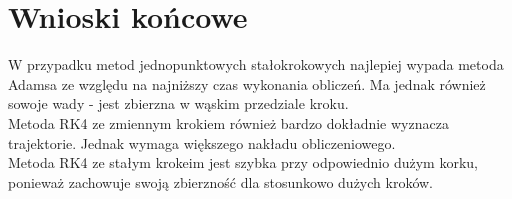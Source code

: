 \documentclass[a4paper, 12pt]{article}
\begin{document}
\section{Wnioski końcowe}
W przypadku metod jednopunktowych stałokrokowych najlepiej wypada metoda Adamsa ze względu na najniższy czas wykonania obliczeń. Ma jednak również sowoje wady - jest  zbierzna w wąskim przedziale kroku. \\
Metoda RK4 ze zmiennym krokiem również bardzo dokładnie wyznacza trajektorie. Jednak wymaga większego nakładu obliczeniowego.\\
Metoda RK4 ze stałym krokeim jest szybka przy odpowiednio dużym korku, ponieważ zachowuje swoją zbierzność dla stosunkowo dużych kroków.
\end{document}
